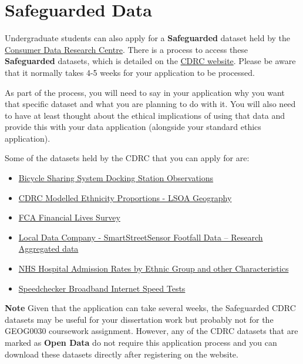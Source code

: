 \documentclass[
]{book}
\providecommand{\tightlist}{%
  \setlength{\itemsep}{0pt}\setlength{\parskip}{0pt}}
\begin{document}
\hypertarget{safeguarded-data}{%
\section{Safeguarded Data}\label{safeguarded-data}}

Undergraduate students can also apply for a \textbf{Safeguarded} dataset held by the \href{https://www.cdrc.ac.uk/}{Consumer Data Research Centre}. There is a process to access these \textbf{Safeguarded} datasets, which is detailed on the \href{https://data.cdrc.ac.uk/using-our-data-services}{CDRC website}. Please be aware that it normally takes 4-5 weeks for your application to be processed.

As part of the process, you will need to say in your application why you want that specific dataset and what you are planning to do with it. You will also need to have at least thought about the ethical implications of using that data and provide this with your data application (alongside your standard ethics application).

Some of the datasets held by the CDRC that you can apply for are:

\begin{itemize}
\tightlist
\item
  \href{https://data.cdrc.ac.uk/dataset/bicycle-sharing-system-docking-station-observations}{Bicycle Sharing System Docking Station Observations}
\item
  \href{https://data.cdrc.ac.uk/dataset/cdrc-modelled-ethnicity-proportions-lsoa-geography}{CDRC Modelled Ethnicity Proportions - LSOA Geography}
\item
  \href{https://data.cdrc.ac.uk/dataset/fca-financial-lives-survey}{FCA Financial Lives Survey}
\item
  \href{https://data.cdrc.ac.uk/dataset/local-data-company-smartstreetsensor-footfall-data-\%E2\%80\%93-research-aggregated-data}{Local Data Company - SmartStreetSensor Footfall Data -- Research Aggregated data}
\item
  \href{https://data.cdrc.ac.uk/dataset/nhs-hospital-admission-rates-ethnic-group-and-other-characteristics}{NHS Hospital Admission Rates by Ethnic Group and other Characteristics}
\item
  \href{https://data.cdrc.ac.uk/dataset/speedchecker-broadband-internet-speed-tests}{Speedchecker Broadband Internet Speed Tests}
\end{itemize}

\textbf{Note}
Given that the application can take several weeks, the Safeguarded CDRC datasets may be useful for your dissertation work but probably not for the GEOG0030 coursework assignment. However, any of the CDRC datasets that are marked as \textbf{Open Data} do not require this application process and you can download these datasets directly after registering on the website.
\end{document}
